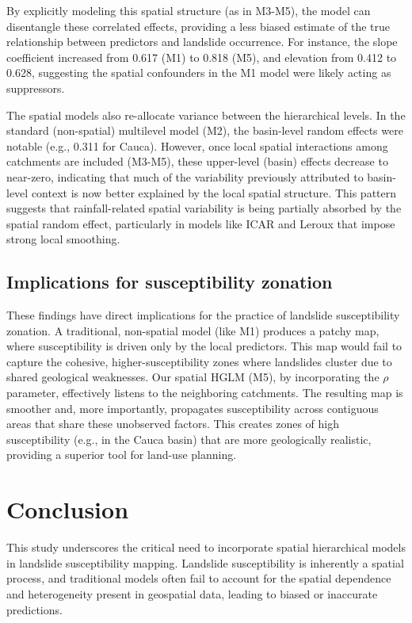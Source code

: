 \documentclass[journal abbreviation, manuscript]{copernicus}
\begin{document}
By explicitly modeling this spatial structure (as in M3-M5), the model can disentangle these correlated effects, providing a less biased estimate of the true relationship between predictors and landslide occurrence. For instance, the slope coefficient increased from 0.617 (M1) to 0.818 (M5), and elevation from 0.412 to 0.628, suggesting the spatial confounders in the M1 model were likely acting as suppressors.

The spatial models also re-allocate variance between the hierarchical levels. In the standard (non-spatial) multilevel model (M2), the basin-level random effects were notable (e.g., 0.311 for Cauca). However, once local spatial interactions among catchments are included (M3-M5), these upper-level (basin) effects decrease to near-zero, indicating that much of the variability previously attributed to basin-level context is now better explained by the local spatial structure. This pattern suggests that rainfall-related spatial variability is being partially absorbed by the spatial random effect, particularly in models like ICAR and Leroux that impose strong local smoothing.

\subsection{Implications for susceptibility zonation}\label{subsec53}

These findings have direct implications for the practice of landslide susceptibility zonation. A traditional, non-spatial model (like M1) produces a patchy map, where susceptibility is driven only by the local predictors. This map would fail to capture the cohesive, higher-susceptibility zones where landslides cluster due to shared geological weaknesses. Our spatial HGLM (M5), by incorporating the $\rho$ parameter, effectively listens to the neighboring catchments. The resulting map is smoother and, more importantly, propagates susceptibility across contiguous areas that share these unobserved factors. This creates zones of high susceptibility (e.g., in the Cauca basin) that are more geologically realistic, providing a superior tool for land-use planning.

\section{Conclusion}\label{sec6}

This study underscores the critical need to incorporate spatial hierarchical models in landslide susceptibility mapping. Landslide susceptibility is inherently a spatial process, and traditional models often fail to account for the spatial dependence and heterogeneity present in geospatial data, leading to biased or inaccurate predictions.
\end{document}
